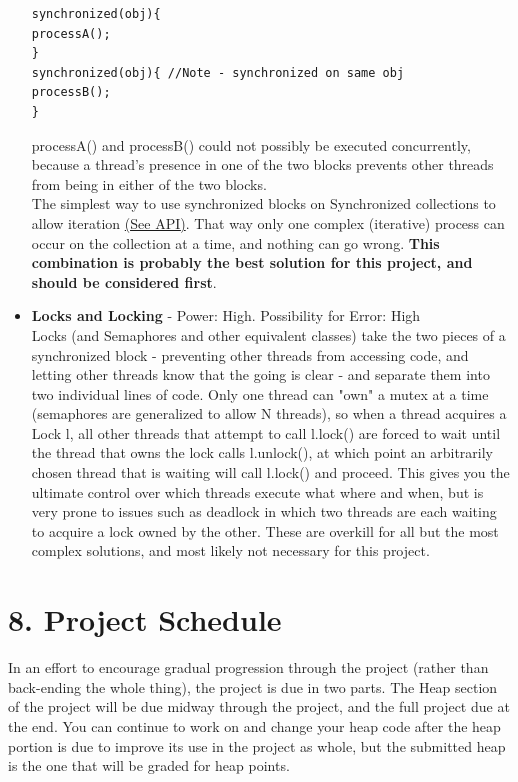\documentclass[11pt]{article}
\begin{document}
\begin{itemize}
\begin{lstlisting}[frame=single]
synchronized(obj){
processA();
}
synchronized(obj){ //Note - synchronized on same obj
processB();
}
\end{lstlisting}
processA() and processB() could not possibly be executed concurrently, because a thread's presence in one of the two blocks prevents other threads from being in either of the two blocks.\\
The simplest way to use synchronized blocks on Synchronized collections to allow iteration \href{http://docs.oracle.com/javase/7/docs/api/java/util/Collections.html\#synchronizedCollection(java.util.Collection)}{({\color{blue}\underline{See API}})}. That way only one complex (iterative) process can occur on the collection at a time, and nothing can go wrong. \textbf{This combination is probably the best solution for this project, and should be considered first}.
\item \textbf{Locks and Locking} - Power: High. Possibility for Error: High\\
Locks (and Semaphores and other equivalent classes) take the two pieces of a synchronized block - preventing other threads from accessing code, and letting other threads know that the going is clear - and separate them into two individual lines of code. Only one thread can "own" a mutex at a time (semaphores are generalized to allow N threads), so when a thread acquires a Lock l, all other threads that attempt to call l.lock() are forced to wait until the thread that owns the lock calls l.unlock(), at which point an arbitrarily chosen thread that is waiting will call l.lock() and proceed. This gives you the ultimate control over which threads execute what where and when, but is very prone to issues such as deadlock in which two threads are each waiting to acquire a lock owned by the other. These are overkill for all but the most complex solutions, and most likely not necessary for this project. 
\end{itemize}

\newpage
\section{8. Project Schedule}
In an effort to encourage gradual progression through the project (rather than back-ending the whole thing), the project is due in two parts. The Heap section of the project will be due midway through the project, and the full project due at the end. You can continue to work on and change your heap code after the heap portion is due to improve its use in the project as whole, but the submitted heap is the one that will be graded for heap points.
\end{document}
